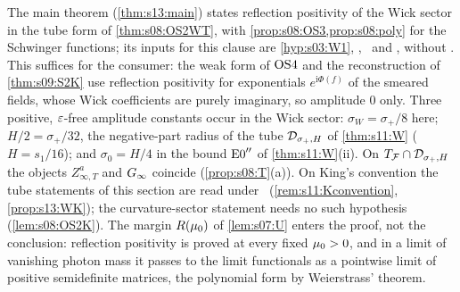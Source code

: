 \begin{remark}\label{rem:s08:amplitudes}
The main theorem (\cref{thm:s13:main}) states reflection positivity of the Wick sector in the tube form of \cref{thm:s08:OS2WT}, with \cref{prop:s08:OS3,prop:s08:poly} for the Schwinger functions; its inputs for this clause are \cref{hyp:s03:W1}, \Itwo, \Ithree\ and \cite[Thm.~6.2(1)--(4)]{BFS1}, without \Wtwo. This suffices for the consumer: the weak form of $\mathrm{OS4}$ and the reconstruction of \cref{thm:s09:S2K} use reflection positivity for exponentials $e^{\mathrm i\Phi(f)}$ of the smeared fields, whose Wick coefficients are purely imaginary, so amplitude $0$ only. Three positive, $\varepsilon$-free amplitude constants occur in the Wick sector: $\sigma_W=\sigma_+/8$ here; $H/2=\sigma_+/32$, the negative-part radius of the tube $\mathcal D_{\sigma_+,H}$ of \cref{thm:s11:W} ($H=s_1/16$); and $\sigma_0=H/4$ in the bound $\mathrm{E0}''$ of \cref{thm:s11:W}(ii). On $T_{\mathcal F}\cap\mathcal D_{\sigma_+,H}$ the objects $Z^a_{\infty,T}$ and $G_\infty$ coincide (\cref{prop:s08:T}(a)). On King's convention the tube statements of this section are read under \TWK\ (\cref{rem:s11:Kconvention}, \cref{prop:s13:WK}); the curvature-sector statement needs no such hypothesis (\cref{lem:s08:OS2K}). The margin $R(\mu_0)$ of \cref{lem:s07:U} enters the proof, not the conclusion: reflection positivity is proved at every fixed $\mu_0>0$, and in a limit of vanishing photon mass it passes to the limit functionals as a pointwise limit of positive semidefinite matrices, the polynomial form by Weierstrass' theorem.
\end{remark}
